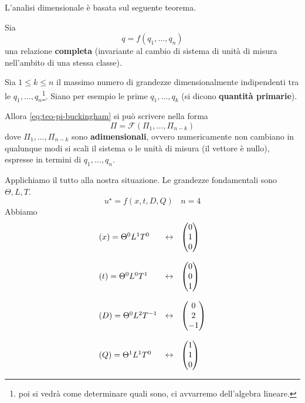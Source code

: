 L'analisi dimensionale è basata sul seguente teorema.
\begin{theorem}
    [Pi di Buckingham] Sia
    \begin{equation}
        q=f(q_{1},\dotsc,q_{n}) \tag{R}
        \label{eq:teo-pi-buckingham}
    \end{equation}
    una relazione \textbf{completa} (invariante al cambio di sistema di unità di misura nell'ambito di una stessa classe).

    Sia $1\leq k\leq n$ il massimo numero di grandezze dimensionalmente indipendenti tra le $q_{1},\dotsc,q_{n}$\footnote{poi si vedrà come determinare quali sono, ci avvarremo dell'algebra lineare.}. Siano per esempio le prime $q_{1},\dotsc,q_{k}$ (si dicono \textbf{quantità primarie}).

    Allora \eqref{eq:teo-pi-buckingham} si può scrivere nella forma
    \begin{equation*}
        \Pi =\mathcal{F}(\Pi _{1},\dotsc,\Pi _{n-k})
    \end{equation*}
    dove $\Pi _{1},\dotsc,\Pi _{n-k}$ sono \textbf{adimensionali}, ovvero numericamente non cambiano in qualunque modi si scali il sistema o le unità di misura (il vettore è nullo), espresse in termini di $q_{1},\dotsc,q_{n}$.
\end{theorem}
Applichiamo il tutto alla nostra situazione. Le grandezze fondamentali sono $\Theta,L,T$.
\begin{equation*}
    u^{\star } =f(x,t,D,Q) \ \ \ \ n=4
\end{equation*}
Abbiamo
\begin{equation*}
    \begin{array}{ l l }
        (x) =\Theta ^{0} L^{1} T^{0}  & \leftrightarrow \ \ \begin{pmatrix}
            0 \\
            1 \\
            0
        \end{pmatrix} \\\\
        (t) =\Theta ^{0} L^{0} T^{1}  & \leftrightarrow \ \ \begin{pmatrix}
            0 \\
            0 \\
            1
        \end{pmatrix} \\\\
        (D) =\Theta ^{0} L^{2} T^{-1} & \leftrightarrow \ \ \begin{pmatrix}
            0 \\
            2 \\
            -1
        \end{pmatrix} \\\\
        (Q) =\Theta ^{1} L^{1} T^{0}  & \leftrightarrow \ \ \begin{pmatrix}
            1 \\
            1 \\
            0
        \end{pmatrix}
    \end{array}
\end{equation*}
